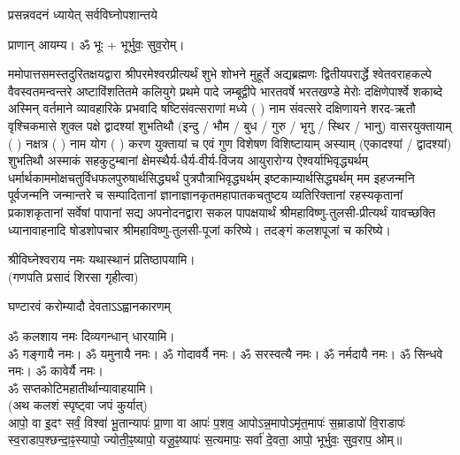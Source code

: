 
\setlength{\parindent}{0pt}




{प्रसन्नवदनं ध्यायेत् सर्वविघ्नोपशान्तये}
 
प्राणान्  आयम्य।  ॐ भूः + भूर्भुवः॒ सुव॒रोम्।


ममोपात्तसमस्तदुरितक्षयद्वारा श्रीपरमेश्वरप्रीत्यर्थं शुभे शोभने मुहूर्ते अद्यब्रह्मणः
द्वितीयपरार्द्धे श्वेतवराहकल्पे वैवस्वतमन्वन्तरे अष्टाविंशतितमे कलियुगे प्रथमे पादे
जम्बूद्वीपे भारतवर्षे भरतखण्डे मेरोः दक्षिणेपार्श्वे शकाब्दे अस्मिन् वर्तमाने व्यावहारिके
 प्रभवादि षष्टिसंवत्सराणां मध्ये (  ) नाम संवत्सरे दक्षिणायने
शरद-ऋतौ  वृश्चिकमासे शुक्ल पक्षे द्वादश्यां शुभतिथौ
(इन्दु / भौम / बुध / गुरु / भृगु / स्थिर / भानु) वासरयुक्तायाम्
(  ) नक्षत्र (  ) नाम  योग  (  ) करण युक्तायां च एवं गुण विशेषण विशिष्टायाम्
अस्याम् (एकादश्यां / द्वादश्यां) शुभतिथौ
अस्माकं सहकुटुम्बानां क्षेमस्थैर्य-धैर्य-वीर्य-विजय आयुरारोग्य ऐश्वर्याभिवृद्ध्यर्थम्
 धर्मार्थकाममोक्ष\-चतुर्विधफलपुरुषार्थसिद्ध्यर्थं पुत्रपौत्राभि\-वृद्ध्यर्थम् इष्टकाम्यार्थसिद्ध्यर्थम्
मम इहजन्मनि पूर्वजन्मनि जन्मान्तरे च सम्पादितानां ज्ञानाज्ञानकृतमहा\-पातकचतुष्टय
व्यतिरिक्तानां रहस्यकृतानां प्रकाशकृतानां सर्वेषां पापानां सद्य अपनोदनद्वारा सकल
पापक्षयार्थं श्रीमहाविष्णु-तुलसी-प्रीत्यर्थं यावच्छक्ति ध्यानावाहनादि
षोडशोपचार श्रीमहाविष्णु-तुलसी-पूजां करिष्ये। तदङ्गं कलशपूजां च करिष्ये।


श्रीविघ्नेश्वराय नमः यथास्थानं प्रतिष्ठापयामि।\\
(गणपति प्रसादं शिरसा गृहीत्वा)



{घण्टारवं करोम्यादौ देवताऽऽह्वानकारणम्}

ॐ कलशाय नमः दिव्यगन्धान् धारयामि।\\
ॐ गङ्गायै नमः। ॐ यमुनायै नमः। ॐ गोदावर्यै नमः।  ॐ सरस्वत्यै नमः। ॐ नर्मदायै नमः। ॐ सिन्धवे नमः। ॐ कावेर्यै नमः।\\
 ॐ सप्तकोटिमहातीर्थान्यावाहयामि। \\

(अथ कलशं स्पृष्ट्वा जपं कुर्यात्) \\
आपो॒ वा इ॒दꣳ सर्वं॒ विश्वा॑ भू॒तान्यापः॑ प्रा॒णा वा आपः॑ प॒शव॒ आपो\-ऽन्न॒मापोऽमृ॑त॒मापः॑ स॒म्राडापो॑ वि॒राडापः॑ स्व॒राडाप॒श्\-छन्दा॒ꣴ॒स्यापो॒ ज्योती॒ꣴ॒ष्यापो॒ यजू॒ꣴ॒ष्यापः॑ स॒त्यमापः॒ सर्वा॑ दे॒वता॒ आपो॒ भूर्भुवः॒ सुव॒राप॒ ओम्॥\\


